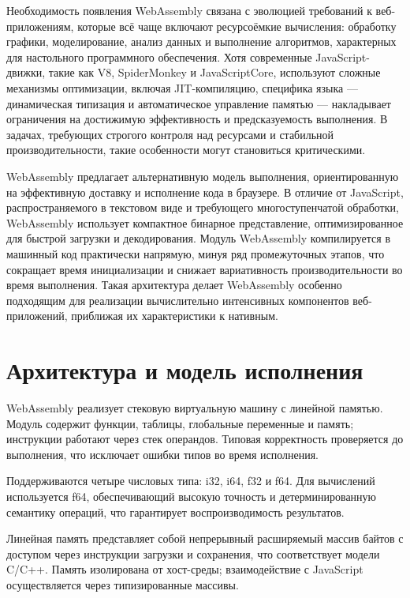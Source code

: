 \documentclass[12pt, oneside]{book}
\begin{document}
    \quad Необходимость появления WebAssembly связана с эволюцией требований к веб-приложениям, которые всё чаще включают ресурсоёмкие вычисления: обработку графики, моделирование, анализ данных и выполнение алгоритмов, характерных для настольного программного обеспечения. Хотя современные JavaScript-движки, такие как V8, SpiderMonkey и JavaScriptCore, используют сложные механизмы оптимизации, включая JIT-компиляцию, специфика языка — динамическая типизация и автоматическое управление памятью — накладывает ограничения на достижимую эффективность и предсказуемость выполнения. В задачах, требующих строгого контроля над ресурсами и стабильной производительности, такие особенности могут становиться критическими.

    \quad WebAssembly предлагает альтернативную модель выполнения, ориентированную на эффективную доставку и исполнение кода в браузере. В отличие от JavaScript, распространяемого в текстовом виде и требующего многоступенчатой обработки, WebAssembly использует компактное бинарное представление, оптимизированное для быстрой загрузки и декодирования. Модуль WebAssembly компилируется в машинный код практически напрямую, минуя ряд промежуточных этапов, что сокращает время инициализации и снижает вариативность производительности во время выполнения. Такая архитектура делает WebAssembly особенно подходящим для реализации вычислительно интенсивных компонентов веб-приложений, приближая их характеристики к нативным.

\section{Архитектура и модель исполнения}

    \quad WebAssembly реализует стековую виртуальную машину с линейной памятью. Модуль содержит функции, таблицы, глобальные переменные и память; инструкции работают через стек операндов. Типовая корректность проверяется до выполнения, что исключает ошибки типов во время исполнения.
    
    \quad Поддерживаются четыре числовых типа: i32, i64, f32 и f64. Для вычислений используется f64, обеспечивающий высокую точность и детерминированную семантику операций, что гарантирует воспроизводимость результатов.
    
    \quad Линейная память представляет собой непрерывный расширяемый массив байтов с доступом через инструкции загрузки и сохранения, что соответствует модели C/C++. Память изолирована от хост-среды; взаимодействие с JavaScript осуществляется через типизированные массивы.
    
\end{document}

